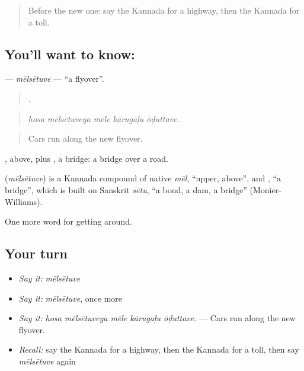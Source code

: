 \label{lesson:KA-C442-melsetuve}



\begin{quote}
Before the new one: say the Kannada for a highway, then the Kannada for a toll.
\end{quote}

\subsection*{You'll want to know: }
\textbf{} — \emph{mēlsētuve} — \textquotedblleft{}a flyover\textquotedblright{}.

\begin{quote}
    .
\end{quote}

\begin{quote}
\emph{hosa mēlsētuveya mēle kārugaḷu ōḍuttave.}
\end{quote}

\begin{quote}
Cars run along the new flyover.
\end{quote}

, above, plus , a bridge: a bridge over a road.

\begin{cousinweb}
\textbf{} (\emph{mēlsētuve}) is a Kannada compound of native \emph{mēl}, \textquotedblleft{}upper, above\textquotedblright{}, and , \textquotedblleft{}a bridge\textquotedblright{}, which is built on Sanskrit \emph{sētu}, \textquotedblleft{}a bond, a dam, a bridge\textquotedblright{} (Monier-Williams).
\end{cousinweb}

\begin{grammarlens}[title={What you've built}]
One more word for getting around.
\end{grammarlens}

\subsection*{Your turn}
\begin{itemize}
\raggedright
  \item \emph{Say it:} \emph{mēlsētuve}
  \item \emph{Say it:} \emph{mēlsētuve}, once more
  \item \emph{Say it:} \emph{hosa mēlsētuveya mēle kārugaḷu ōḍuttave.} — Cars run along the new flyover.
  \item \emph{Recall:} say the Kannada for a highway, then the Kannada for a toll, then say \emph{mēlsētuve} again
\end{itemize}

